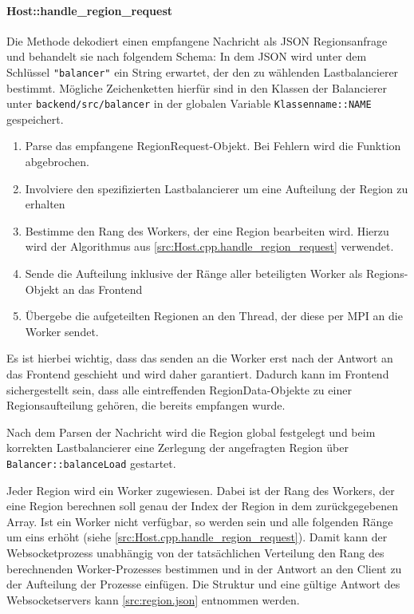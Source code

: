 \paragraph{Host::handle\_region\_request}\label{cls:Host::handle_region_request}

Die Methode dekodiert einen empfangene Nachricht als JSON Regionsanfrage und behandelt sie nach folgendem Schema:
In dem JSON wird unter dem Schlüssel \verb|"balancer"| ein String erwartet, der den zu wählenden Lastbalancierer bestimmt.
Mögliche Zeichenketten hierfür sind in den Klassen der Balancierer unter \verb|backend/src/balancer| in der globalen Variable
\verb|Klassenname::NAME| gespeichert.

\begin{enumerate}
	\item Parse das empfangene RegionRequest-Objekt. Bei Fehlern wird die Funktion abgebrochen.
	\item Involviere den spezifizierten Lastbalancierer um eine Aufteilung der Region zu erhalten
	\item Bestimme den Rang des Workers, der eine Region bearbeiten wird. Hierzu wird der Algorithmus aus \autoref{src:Host.cpp.handle_region_request} verwendet.
	\item Sende die Aufteilung inklusive der Ränge aller beteiligten Worker als Regions-Objekt an das Frontend
	\item Übergebe die aufgeteilten Regionen an den Thread, der diese per MPI an die Worker sendet.
\end{enumerate}

Es ist hierbei wichtig, dass das senden an die Worker erst nach der Antwort an das Frontend geschieht und wird daher garantiert.
Dadurch kann im Frontend sichergestellt sein, dass alle eintreffenden RegionData-Objekte zu einer Regionsaufteilung gehören,
die bereits empfangen wurde.





Nach dem Parsen der Nachricht wird die Region global festgelegt und beim korrekten Lastbalancierer eine Zerlegung der angefragten Region über \verb|Balancer::balanceLoad| gestartet.

Jeder Region wird ein Worker zugewiesen.
Dabei ist der Rang des Workers, der eine Region berechnen soll genau der Index der Region in dem zurückgegebenen Array.
Ist ein Worker nicht verfügbar, so werden sein und alle folgenden Ränge um eins erhöht (siehe \autoref{src:Host.cpp.handle_region_request}).
Damit kann der Websocketprozess unabhängig von der tatsächlichen Verteilung den Rang des berechnenden Worker-Prozesses
bestimmen und in der Antwort an den Client zu der Aufteilung der Prozesse einfügen.
Die Struktur und eine gültige Antwort des Websocketservers kann \autoref{src:region.json} entnommen werden.

